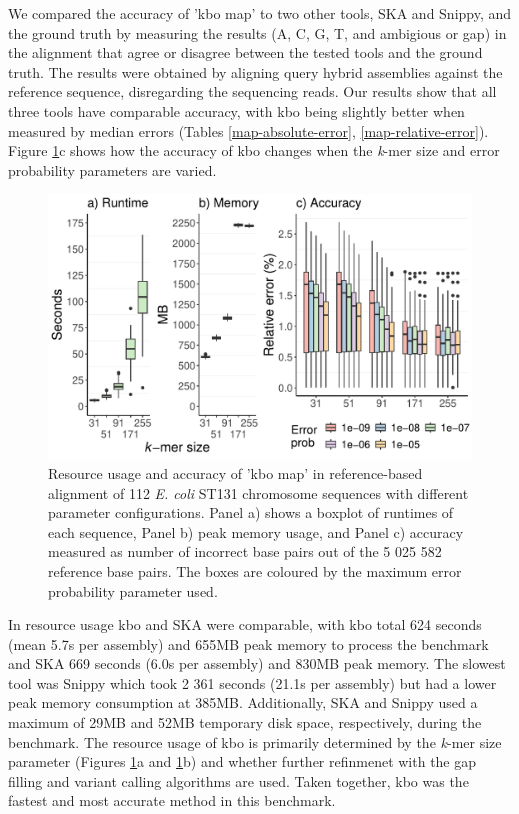 \documentclass[unnumsec,webpdf,contemporary,large]{oup-authoring-template}%
\theoremstyle{thmstyleone}%
\theoremstyle{thmstyletwo}%
\theoremstyle{thmstylethree}%
\begin{document}
We compared the accuracy of 'kbo map' to two other tools, SKA\cite{derelle2024seamless} and Snippy\cite{seemann2015snippy}, and the ground truth by measuring the results (A, C, G, T, and ambigious or gap) in the alignment that agree or disagree between the tested tools and the ground truth. The results were obtained by aligning query hybrid assemblies against the reference sequence, disregarding the sequencing reads. Our results show that all three tools have comparable accuracy, with {\sf kbo} being slightly better when measured by median errors (Tables \ref{map-absolute-error}, \ref{map-relative-error}). Figure \ref{fig:map-by-kmer-size}c shows how the accuracy of {\sf kbo} changes when the \emph{k}-mer size and error probability parameters are varied.

\begin{figure}
    \centering
    \includegraphics[width=1.0\linewidth]{map_parameter_comparison.pdf}
    \caption{Resource usage and accuracy of 'kbo map' in reference-based alignment of 112 \textit{E. coli} ST131 chromosome sequences with different parameter configurations. Panel a) shows a boxplot of runtimes of each sequence, Panel b) peak memory usage, and Panel c) accuracy measured as number of incorrect base pairs out of the 5 025 582 reference base pairs. The boxes are coloured by the maximum error probability parameter used.}
    \label{fig:map-by-kmer-size}
\end{figure}


In resource usage {\sf kbo} and SKA were comparable, with {\sf kbo} total 624 seconds (mean 5.7s per assembly) and 655MB peak memory to process the benchmark and SKA 669 seconds (6.0s per assembly) and 830MB peak memory. The slowest tool was Snippy which took 2 361 seconds (21.1s per assembly) but had a lower peak memory consumption at 385MB. Additionally, SKA and Snippy used a maximum of 29MB and 52MB temporary disk space, respectively, during the benchmark. The resource usage of {\sf kbo} is primarily determined by the \emph{k}-mer size parameter (Figures \ref{fig:map-by-kmer-size}a and \ref{fig:map-by-kmer-size}b) and whether further refinmenet with the gap filling and variant calling algorithms are used. Taken together, {\sf kbo} was the fastest and most accurate method in this benchmark.
\end{document}
